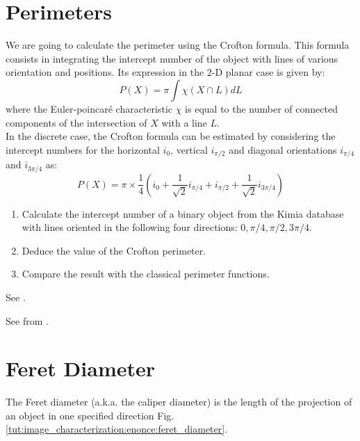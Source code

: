 \section{Perimeters}
We are going to calculate the perimeter using the Crofton formula. This formula consists in integrating the intercept number of the object with lines of various orientation and positions.
Its expression in the 2-D planar case is given by:
$$
P(X)=\pi\int\chi(X\cap L)dL
$$
where the Euler-poincar\'e characteristic $\chi$ is equal to the number of connected components of the intersection of $X$ with a line $L$.\\
In the discrete case, the Crofton formula can be estimated by considering the intercept numbers for the horizontal $i_0$, vertical $i_{\pi/2}$ and diagonal orientations $i_{\pi/4}$ and $i_{3\pi/4}$ as:
$$
P(X)=\pi\times \frac{1}{4}\left(i_0+\frac{1}{\sqrt{2}}i_{\pi/4}+i_{\pi/2}+\frac{1}{\sqrt{2}}i_{3\pi/4}\right)
$$
\begin{qbox}
\begin{enumerate}
	\item Calculate the intercept number of a binary object from the Kimia database with lines oriented in the following four  directions: $0, \pi/4, \pi/2, 3\pi/4$.
	\item Deduce the value of the Crofton perimeter.
	\item Compare the result with the classical perimeter functions.
\end{enumerate}	
\end{qbox}

\begin{mcomment}
\begin{mremark}
See .
\end{mremark}
\end{mcomment}

\begin{pcomment}
\begin{premark}
See  from .
\end{premark}
\end{pcomment}


\section{Feret Diameter}\vspace*{-8pt}
The Feret diameter (a.k.a. the caliper diameter) is the length of the projection of an object in one specified direction Fig.\ref{tut:image_characterization:enonce:feret_diameter}.

